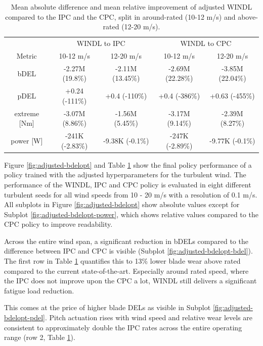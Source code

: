 \begin{table}[hbt!]
  \centering
  \begin{tabular}{c@{\hskip 0.7cm}cc@{\hskip 0.7cm}cc}
    \toprule
    & \multicolumn{2}{c}{WINDL to IPC} & \multicolumn{2}{c}{WINDL to CPC} \\
    Metric & 10-12 m/s & 12-20 m/s & 10-12 m/s & 12-20 m/s \\
    \midrule
    bDEL & -2.27M (19.8\%) & -2.11M (13.45\%) & -2.69M (22.28\%) & -3.85M (22.04\%) \\
    pDEL & +0.24 (-111\%) & +0.4 (-110\%) & +0.4 (-386\%) & +0.63 (-455\%) \\
    extreme [Nm] & -3.07M (8.86\%) & -1.56M (5.45\%) & -3.17M (9.14\%) & -2.39M (8.27\%) \\
    power [W] & -241K (-2.83\%) & -9.38K (-0.1\%) & -247K (-2.89\%) & -9.77K (-0.1\%) \\
    \bottomrule
  \end{tabular}
  \caption{Mean absolute difference and mean relative improvement of adjusted WINDL compared to the IPC and the CPC, split in around-rated (10-12 m/s) and above-rated (12-20 m/s).}
  \label{table:improvements-bdelopt}
\end{table}

Figure \ref{fig:adjusted-bdelopt} and Table \ref{table:improvements-bdelopt} show the final policy performance of a policy trained with the adjusted hyperparameters for the turbulent wind. The performance of the WINDL, IPC and CPC policy is evaluated in eight different turbulent seeds for all wind speeds from 10 - 20 m/s with a resolution of 0.1 m/s. All subplots in Figure \ref{fig:adjusted-bdelopt} show absolute values except for Subplot \ref{fig:adjusted-bdelopt-power}, which shows relative values compared to the CPC policy to improve readability.

Across the entire wind span, a significant reduction in bDELs compared to the difference between IPC and CPC is visible (Subplot \ref{fig:adjusted-bdelopt-bdel}). The first row in Table \ref{table:improvements-bdelopt} quantifies this to 13\% lower blade wear above rated compared to the current state-of-the-art. Especially around rated speed, where the IPC does not improve upon the CPC a lot, WINDL still delivers a significant fatigue load reduction. 

This comes at the price of higher blade DELs as visible in Subplot \ref{fig:adjusted-bdelopt-pdel}. Pitch actuation rises with wind speed and relative wear levels are consistent to approximately double the IPC rates across the entire operating range (row 2, Table \ref{table:improvements-bdelopt}). 

